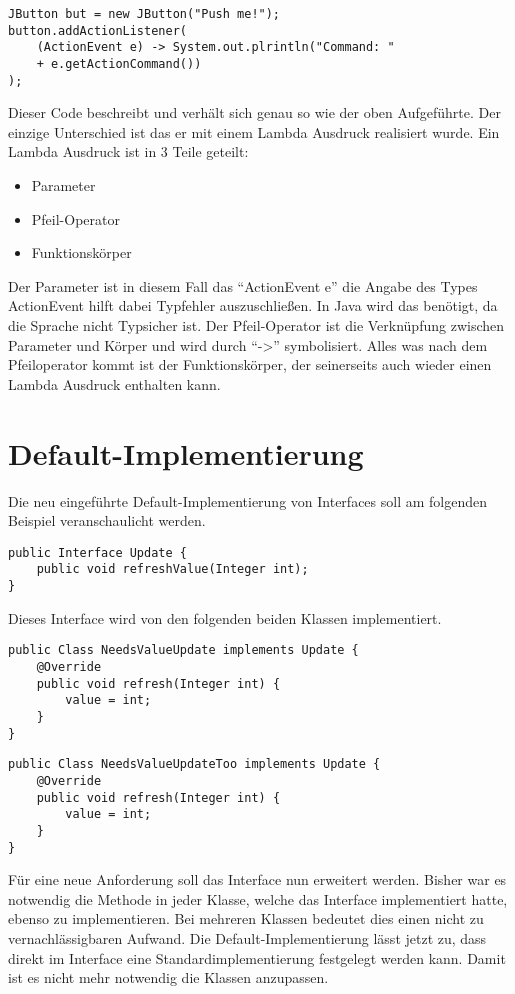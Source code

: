 \pagebreak

\begin{lstlisting}
JButton but = new JButton("Push me!");
button.addActionListener(
	(ActionEvent e) -> System.out.plrintln("Command: " 
	+ e.getActionCommand())
);
\end{lstlisting}
Dieser Code beschreibt und verhält sich genau so wie der oben Aufgeführte. Der
einzige Unterschied ist das er mit einem Lambda Ausdruck realisiert wurde.
Ein Lambda Ausdruck ist in 3 Teile geteilt:
\begin{itemize}
	\item Parameter
	\item Pfeil-Operator
	\item Funktionskörper
\end{itemize}

Der Parameter ist in diesem Fall das "`ActionEvent e"' die Angabe des Types
ActionEvent hilft dabei Typfehler auszuschließen. In Java wird das benötigt, da
die Sprache nicht Typsicher ist. Der Pfeil-Operator ist die Verknüpfung zwischen
Parameter und Körper und wird durch "`->"' symbolisiert. Alles was nach dem
Pfeiloperator kommt ist der Funktionskörper, der seinerseits auch wieder einen
Lambda Ausdruck enthalten kann.

\section{Default-Implementierung}
\label{sec:DI}

Die neu eingeführte Default-Implementierung von Interfaces soll am folgenden
Beispiel veranschaulicht werden.

\begin{lstlisting}
public Interface Update {
	public void refreshValue(Integer int);
}
\end{lstlisting}

Dieses Interface wird von den folgenden beiden Klassen implementiert.

\begin{lstlisting}
public Class NeedsValueUpdate implements Update {
	@Override
	public void refresh(Integer int) {
		value = int;
	}
}
\end{lstlisting}

\begin{lstlisting}
public Class NeedsValueUpdateToo implements Update {
	@Override
	public void refresh(Integer int) {
		value = int;
	}
}
\end{lstlisting}

Für eine neue Anforderung soll das Interface nun erweitert werden. Bisher war es
notwendig die Methode in jeder Klasse, welche das Interface implementiert
hatte, ebenso zu implementieren. Bei mehreren Klassen bedeutet dies einen nicht
zu vernachlässigbaren Aufwand. Die Default-Implementierung lässt jetzt zu, dass
direkt im Interface eine Standardimplementierung festgelegt werden kann. Damit
ist es nicht mehr notwendig die Klassen anzupassen.

